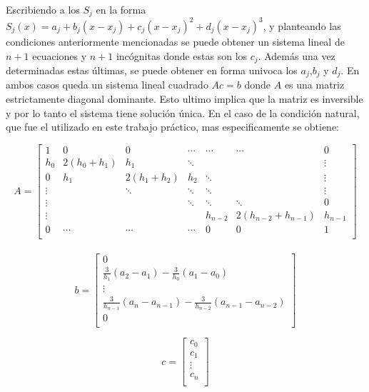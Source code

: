 \documentclass[a4paper]{article}
\begin{document}
Escribiendo a los $ S_j $ en la forma $S_j(x) = a_j + b_j(x-x_j)+c_j(x-x_j)^2+d_j(x-x_j)^3$, y planteando las condiciones anteriormente mencionadas se puede obtener un sistema lineal de $ n+1 $ ecuaciones y $ n+1 $ incógnitas donde estas son los $ c_{j} $. Además una vez determinadas estas últimas, se puede obtener en forma univoca los $ a_{j}$,$ b_{j} $ y $d_{j}$. En ambos casos queda un sistema lineal cuadrado $ Ac=b $ donde $ A $ es una matriz estrictamente diagonal dominante. Esto ultimo implica que la matriz es inversible y por lo tanto el sistema tiene solución única. En el caso de la condición natural, que fue el utilizado en este trabajo práctico, mas especificamente se obtiene:

$$
A =
\begin{bmatrix}
    1      & 0                  & 0      & \cdots & \cdots  & \cdots             & 0      \\
    h_0    & 2(h_0+h_1)         & h_1    & \ddots &         &                    & \vdots \\
    0      & h_1 & 2(h_1 + h_2) & h_2    & \ddots &         &                     \vdots \\
    \vdots &                    & \ddots & \ddots & \ddots  &                    & \vdots \\
    \vdots &                    &        & \ddots & \ddots  & \ddots             & 0      \\
    \vdots &                    &        &        & h_{n-2} & 2(h_{n-2}+h_{n-1}) & h_{n-1} \\
    0      & \cdots             & \cdots & \cdots & 0       & 0                  & 1 \\
\end{bmatrix}
$$ \\


$$
b=
\begin{bmatrix}
0 \\
\frac{3}{h_1}(a_2-a_1)-\frac{3}{h_0}(a_1-a_0) \\
\vdots \\
\frac{3}{h_{n-1}}(a_n-a_{n-1})-\frac{3}{h_{n-2}}(a_{n-1}-a_{n-2}) \\
0 \\
\end{bmatrix}
$$

$$
c=
\begin{bmatrix}
c_0\\
c_1\\
\vdots \\
c_n\\
\end{bmatrix}
$$
\end{document}
